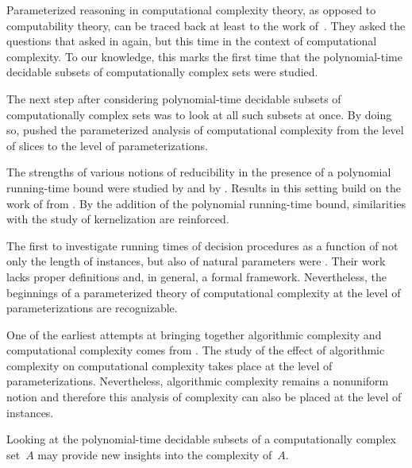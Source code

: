 \begin{description}
  Parameterized reasoning in computational complexity theory, as opposed to computability theory, can be traced back at least to the work of~\citeauthor{flajolet1974sets}.
  They asked the questions that \citeauthor{post1944recursively} asked in \citeyear{post1944recursively} again, but this time in the context of computational complexity.
  To our knowledge, this marks the first time that the polynomial-time decidable subsets of computationally complex sets were studied.
\item[\yeartextcite{lynch1975reducibility}]
  The next step after considering polynomial-time decidable subsets of computationally complex sets was to look at all such subsets at once.
  By doing so, \citeauthor{lynch1975reducibility} pushed the parameterized analysis of computational complexity from the level of slices to the level of parameterizations.
\item[{\yeartextcite[selman1979p-selective]{meyer1979with}}]
  The strengths of various notions of reducibility in the presence of a polynomial running-time bound were studied by \citeauthor{selman1979p-selective} and by \citeauthor{meyer1979with}.
  Results in this setting build on the work of \citeauthor{jockusch1968semirecursive} from \citeyear{jockusch1968semirecursive}.
  By the addition of the polynomial running-time bound, similarities with the study of kernelization are reinforced.
\item[\yeartextcite{garey1979computers}]
  The first to investigate running times of decision procedures as a function of not only the length of instances, but also of natural parameters were \citeauthor{garey1979computers}.
  Their work lacks proper definitions and, in general, a formal framework.
  Nevertheless, the beginnings of a parameterized theory of computational complexity at the level of parameterizations are recognizable.
\item[\yeartextcite{hartmanis1983generalized}]
  One of the earliest attempts at bringing together algorithmic complexity and computational complexity comes from \citeauthor{hartmanis1983generalized}.
  The study of the effect of algorithmic complexity on computational complexity takes place at the level of parameterizations.
  Nevertheless, algorithmic complexity remains a nonuniform notion and therefore this analysis of complexity can also be placed at the level of instances.
\item[\yeartextcite{orponen1985polynomial}]
  Looking at the polynomial-time decidable subsets of a computationally complex set~$A$ may provide new insights into the complexity of~$A$.

\end{description}
